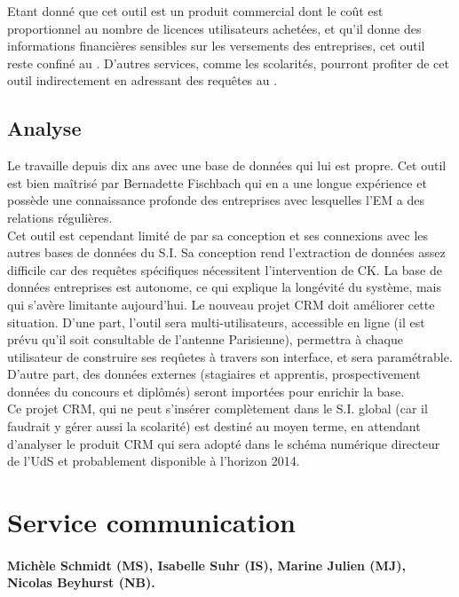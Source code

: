 \documentclass{book}
\begin{document}
Etant donné que cet outil est un produit commercial dont le coût est
proportionnel au nombre de licences utilisateurs achetées, et qu'il
donne des informations financières sensibles sur les versements des
entreprises, cet outil reste confiné au \sre. D'autres services, comme
les scolarités, pourront profiter de cet outil indirectement en adressant
des requêtes au \sre.

\subsection{Analyse}
Le \sre travaille depuis dix ans avec une base de données qui lui est
propre. Cet outil est bien maîtrisé par Bernadette Fischbach qui en
a une longue expérience et possède une connaissance profonde des 
entreprises avec lesquelles l'EM a des relations régulières. \\

Cet outil est cependant limité de par sa conception et ses connexions
avec les autres bases de données du S.I. Sa conception rend l'extraction
de données assez difficile car des requêtes spécifiques nécessitent 
l'intervention de CK. La base de données entreprises est autonome, ce
qui explique la longévité du système, mais qui s'avère limitante aujourd'hui.
Le nouveau projet CRM doit améliorer cette situation. D'une part, l'outil
sera multi-utilisateurs, accessible en ligne (il est prévu qu'il soit 
consultable de l'antenne Parisienne), permettra à chaque utilisateur de 
construire ses reqûetes à travers son interface, et sera paramétrable. 
D'autre part, des données externes (stagiaires et apprentis, prospectivement 
données du concours et diplômés) seront importées pour enrichir la base.\\

Ce projet CRM, qui ne peut s'insérer complètement dans le S.I. global
(car il faudrait y gérer aussi la scolarité) est destiné au moyen terme,
en attendant d'analyser le produit CRM qui sera adopté dans le schéma
numérique directeur de l'UdS et probablement disponible à l'horizon 2014. 

  

\section{Service communication}

\paragraph{Michèle Schmidt (MS), Isabelle Suhr (IS), Marine Julien (MJ), 
Nicolas Beyhurst (NB).}
\end{document}
